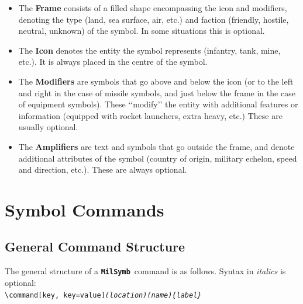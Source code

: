 \documentclass[a4paper, titlepage]{article}
\newcommand\MilSymb{\textbf{\texttt{MilSymb}}}
\begin{document}
\begin{itemize}
\item The \textbf{Frame} consists of a filled shape encompassing the icon and modifiers, denoting the type (land, sea surface, air, etc.) and faction (friendly, hostile, neutral, unknown) of the symbol. In some situations this is optional.
\item The \textbf{Icon} denotes the entity the symbol represents (infantry, tank, mine, etc.). It is always placed in the centre of the symbol.
\item The \textbf{Modifiers} are symbols that go above and below the icon (or to the left and right in the case of missile symbols, and just below the frame in the case of equipment symbols). These \lq\lq{}modify\rq\rq{} the entity with additional features or information (equipped with rocket launchers, extra heavy, etc.)  These are usually optional.
\item The \textbf{Amplifiers} are text and symbols that go outside the frame, and denote additional attributes of the symbol (country of origin, military echelon, speed and direction, etc.). These are always optional.
\end{itemize}

\section{Symbol Commands}

\subsection{General Command Structure}

The general structure of a \MilSymb\  command is as follows. Syntax in \textit{italics} is optional:\\

\texttt{\textbackslash command[key, key=value]\textit{(location)(name)\{label\}}}
\end{document}
